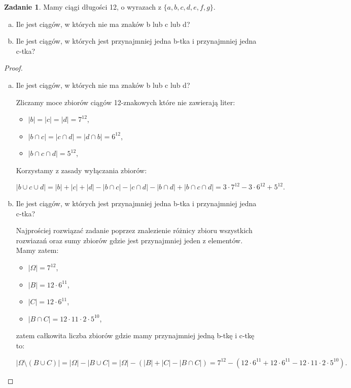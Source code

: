 \documentclass[11pt]{article}
\theoremstyle{definition}
\newtheorem{zadanie}{Zadanie}
\numberwithin{zadanie}{subsection}
\begin{document}
\begin{zadanie}
    Mamy ciągi długości 12, o wyrazach z $\{ a, b, c, d, e, f, g \}$.
    \begin{enumerate}[a)]
        \item Ile jest ciągów, w których nie ma znaków b lub c lub d?
        \item Ile jest ciągów, w których jest przynajmniej jedna b-tka i przynajmniej jedna c-tka?
    \end{enumerate}
\end{zadanie}
\begin{proof}
    \begin{enumerate}[a)]
        \item Ile jest ciągów, w których nie ma znaków b lub c lub d?

              Zliczamy moce zbiorów ciągów 12-znakowych które nie zawierają liter:
              \begin{itemize}
                  \item $|b| = |c| = |d| = 7^{12}$,
                  \item $|b\cap c| =|c\cap d| =|d\cap b| = 6^{12}$,
                  \item $|b\cap c\cap d| = 5^{12}$,
              \end{itemize}

              Korzystamy z zasady wyłączania zbiorów:

              $$|b\cup c\cup d| = |b|+|c|+|d| - |b\cap c| - |c\cap d|-|b\cap d| + |b\cap c\cap d|=3\cdot7^{12}-3\cdot 6^{12}+5^{12}.$$

        \item Ile jest ciągów, w których jest przynajmniej jedna b-tka i przynajmniej jedna c-tka?

              Najprościej rozwiązać zadanie poprzez znalezienie różnicy zbioru wszystkich rozwiazań oraz sumy zbiorów gdzie jest przynajmniej jeden z elementów. Mamy zatem:

              \begin{itemize}
                  \item $|\Omega| = 7^{12}$,
                  \item $|B| = 12\cdot 6^{11}$,
                  \item $|C| = 12\cdot 6^{11}$,
                  \item $|B\cap C| = 12\cdot11\cdot2\cdot 5^{10}$,
              \end{itemize}

              zatem całkowita liczba zbiorów gdzie mamy przynajmniej jedną b-tkę i c-tkę to:

              $$|\Omega\setminus(B\cup C)| = |\Omega|-|B\cup C| = |\Omega| - (|B|+|C|-|B\cap C|) = 7^{12} - (12\cdot 6^{11}+12\cdot 6^{11}-12\cdot11\cdot2\cdot 5^{10}).$$

    \end{enumerate}
\end{proof}
\end{document}
